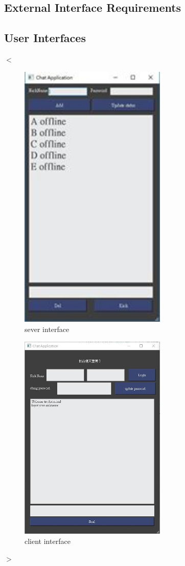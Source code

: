 \documentclass{scrreprt}
\begin{document}
\begin{CJK}{UTF8}{bkai}
\chapter{External Interface Requirements}

\section{User Interfaces}
$<$

\begin{figure}[h]
\begin{center}
\includegraphics[width=7cm]{interface3.jpg}
\end{center}
\caption{sever interface}
\label{fig:2}
\end{figure}

\begin{figure}[h]
\begin{center}
\includegraphics[width=7cm]{interface1.jpg}
\end{center}
\caption{client interface}
\label{fig:3}
\end{figure}
$>$




\end{CJK}
\end{document}
